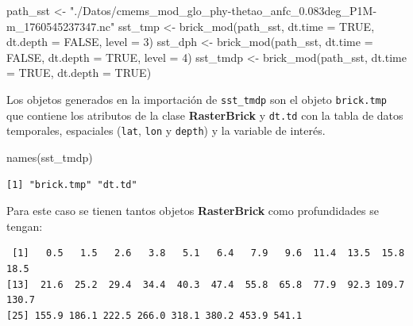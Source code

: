 \documentclass[
]{article}
\newenvironment{Shaded}{\begin{snugshade}}{\end{snugshade}}
\newcommand{\AttributeTok}[1]{\textcolor[rgb]{0.40,0.45,0.13}{#1}}
\newcommand{\ConstantTok}[1]{\textcolor[rgb]{0.56,0.35,0.01}{#1}}
\newcommand{\DecValTok}[1]{\textcolor[rgb]{0.68,0.00,0.00}{#1}}
\newcommand{\FunctionTok}[1]{\textcolor[rgb]{0.28,0.35,0.67}{#1}}
\newcommand{\NormalTok}[1]{\textcolor[rgb]{0.00,0.23,0.31}{#1}}
\newcommand{\OtherTok}[1]{\textcolor[rgb]{0.00,0.23,0.31}{#1}}
\newcommand{\SpecialCharTok}[1]{\textcolor[rgb]{0.37,0.37,0.37}{#1}}
\newcommand{\StringTok}[1]{\textcolor[rgb]{0.13,0.47,0.30}{#1}}
\begin{document}
\begin{Shaded}
\begin{Highlighting}[]
\NormalTok{path\_sst }\OtherTok{\textless{}{-}} \StringTok{"./Datos/cmems\_mod\_glo\_phy{-}thetao\_anfc\_0.083deg\_P1M{-}m\_1760545237347.nc"}
\NormalTok{sst\_tmp }\OtherTok{\textless{}{-}} \FunctionTok{brick\_mod}\NormalTok{(path\_sst, }\AttributeTok{dt.time =} \ConstantTok{TRUE}\NormalTok{, }\AttributeTok{dt.depth =} \ConstantTok{FALSE}\NormalTok{, }\AttributeTok{level =} \DecValTok{3}\NormalTok{)}
\NormalTok{sst\_dph }\OtherTok{\textless{}{-}} \FunctionTok{brick\_mod}\NormalTok{(path\_sst, }\AttributeTok{dt.time =} \ConstantTok{FALSE}\NormalTok{, }\AttributeTok{dt.depth =} \ConstantTok{TRUE}\NormalTok{, }\AttributeTok{level =} \DecValTok{4}\NormalTok{)}
\NormalTok{sst\_tmdp }\OtherTok{\textless{}{-}} \FunctionTok{brick\_mod}\NormalTok{(path\_sst, }\AttributeTok{dt.time =} \ConstantTok{TRUE}\NormalTok{, }\AttributeTok{dt.depth =} \ConstantTok{TRUE}\NormalTok{)}
\end{Highlighting}
\end{Shaded}

Los objetos generados en la importación de \texttt{sst\_tmdp} son el
objeto \texttt{brick.tmp} que contiene los atributos de la clase
\textbf{RasterBrick} y \texttt{dt.td} con la tabla de datos temporales,
espaciales (\texttt{lat}, \texttt{lon} y \texttt{depth}) y la variable
de interés.

\begin{Shaded}
\begin{Highlighting}[]
\FunctionTok{names}\NormalTok{(sst\_tmdp)}
\end{Highlighting}
\end{Shaded}

\begin{verbatim}
[1] "brick.tmp" "dt.td"    
\end{verbatim}

Para este caso se tienen tantos objetos \textbf{RasterBrick} como
profundidades se tengan:

\begin{Shaded}
\end{Shaded}

\begin{verbatim}
 [1]   0.5   1.5   2.6   3.8   5.1   6.4   7.9   9.6  11.4  13.5  15.8  18.5
[13]  21.6  25.2  29.4  34.4  40.3  47.4  55.8  65.8  77.9  92.3 109.7 130.7
[25] 155.9 186.1 222.5 266.0 318.1 380.2 453.9 541.1
\end{verbatim}
\end{document}
